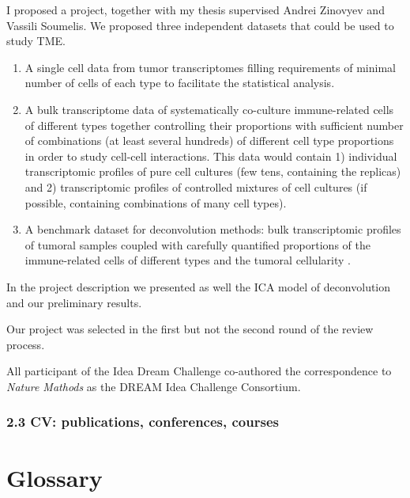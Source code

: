 \documentclass[12pt,]{book}
\providecommand{\tightlist}{%
  \setlength{\itemsep}{0pt}\setlength{\parskip}{0pt}}
\theoremstyle{definition}
\theoremstyle{definition}
\theoremstyle{definition}
\theoremstyle{remark}
\begin{document}
I proposed a project, together with my thesis supervised Andrei Zinovyev
and Vassili Soumelis. We proposed three independent datasets that could
be used to study TME.

\begin{enumerate}
\def\labelenumi{\arabic{enumi}.}
\tightlist
\item
  A single cell data from tumor transcriptomes filling requirements of
  minimal number of cells of each type to facilitate the statistical
  analysis.
\item
  A bulk transcriptome data of systematically co-culture immune-related
  cells of different types together controlling their proportions with
  sufficient number of combinations (at least several hundreds) of
  different cell type proportions in order to study cell-cell
  interactions. This data would contain 1) individual transcriptomic
  profiles of pure cell cultures (few tens, containing the replicas) and
  2) transcriptomic profiles of controlled mixtures of cell cultures (if
  possible, containing combinations of many cell types).
\item
  A benchmark dataset for deconvolution methods: bulk transcriptomic
  profiles of tumoral samples coupled with carefully quantified
  proportions of the immune-related cells of different types and the
  tumoral cellularity .
\end{enumerate}

In the project description we presented as well the ICA model of
deconvolution and our preliminary results.

Our project was selected in the first but not the second round of the
review process.

All participant of the Idea Dream Challenge co-authored the
correspondence to \emph{Nature Mathods} as the DREAM Idea Challenge
Consortium.



\hypertarget{cv-publications-conferences-courses}{%
\subsection*{2.3 CV: publications, conferences,
courses}\label{cv-publications-conferences-courses}}



\newpage

\hypertarget{glossary}{%
\chapter*{Glossary}\label{glossary}}
\end{document}
